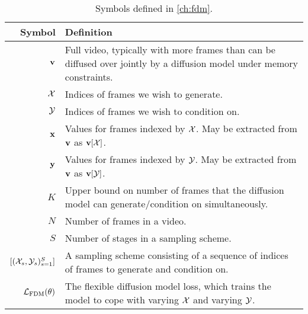 \begin{table*}
  \caption{Symbols defined in \cref{ch:fdm}.}
  \label{tab:notation-appendix-fdm}
  \centering
  \footnotesize
  \begin{tabular}{rp{9cm}}
    \toprule
    Symbol    & Definition   \\
    \midrule
    ${\mathbf{v}}$                                  & Full video, typically with more frames than can be diffused over jointly by a diffusion model under memory constraints. \\
    ${\mathcal{X}}$                                  & Indices of frames we wish to generate. \\
    ${\mathcal{Y}}$                                  & Indices of frames we wish to condition on. \\
    ${\mathbf{x}}$                                 & Values for frames indexed by ${\mathcal{X}}$. May be extracted from ${\mathbf{v}}$ as ${\mathbf{v}}[{\mathcal{X}}]$. \\
    ${\mathbf{y}}$                                 & Values for frames indexed by ${\mathcal{Y}}$. May be extracted from ${\mathbf{v}}$ as ${\mathbf{v}}[{\mathcal{Y}}]$. \\
    $K$                                    & Upper bound on number of frames that the diffusion model can generate/condition on simultaneously. \\
    $N$                                    & Number of frames in a video. \\
    $S$                                    & Number of stages in a sampling scheme. \\
    $[ ({\mathcal{X}}_s, {\mathcal{Y}}_s)_{s=1}^S ]$           & A sampling scheme consisting of a sequence of indices of frames to generate and condition on. \\
    ${\mathcal{L}}_\text{FDM}(\theta)$                      & The flexible diffusion model loss, which trains the model to cope with varying ${\mathcal{X}}$ and varying ${\mathcal{Y}}$. \\
    \bottomrule
  \end{tabular}
\end{table*}


